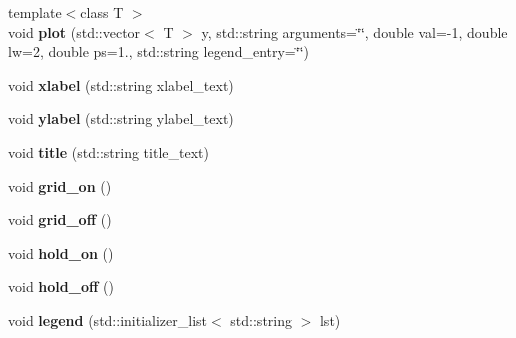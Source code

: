 \begin{DoxyCompactItemize}
\item 
\hypertarget{classkeycpp_1_1_figure_a3646790552f73645bf926b1678fede40}{{\footnotesize template$<$class T $>$ }\\void {\bfseries plot} (std\-::vector$<$ T $>$ y, std\-::string arguments=\char`\"{}\char`\"{}, double val=-\/1, double lw=2, double ps=1., std\-::string legend\-\_\-entry=\char`\"{}\char`\"{})}\label{classkeycpp_1_1_figure_a3646790552f73645bf926b1678fede40}

\item 
\hypertarget{classkeycpp_1_1_figure_addd610a718f021f3e6c7c94f9bc7f285}{void {\bfseries xlabel} (std\-::string xlabel\-\_\-text)}\label{classkeycpp_1_1_figure_addd610a718f021f3e6c7c94f9bc7f285}

\item 
\hypertarget{classkeycpp_1_1_figure_aa965967db2165b001860f75fc22c9f28}{void {\bfseries ylabel} (std\-::string ylabel\-\_\-text)}\label{classkeycpp_1_1_figure_aa965967db2165b001860f75fc22c9f28}

\item 
\hypertarget{classkeycpp_1_1_figure_a922bd966ed40095f0ae7fa184f9d0ada}{void {\bfseries title} (std\-::string title\-\_\-text)}\label{classkeycpp_1_1_figure_a922bd966ed40095f0ae7fa184f9d0ada}

\item 
\hypertarget{classkeycpp_1_1_figure_a3c036559f8ad56b099ac0b44c652225d}{void {\bfseries grid\-\_\-on} ()}\label{classkeycpp_1_1_figure_a3c036559f8ad56b099ac0b44c652225d}

\item 
\hypertarget{classkeycpp_1_1_figure_a3736e01bc278c2c2b47e4ff046fdda0e}{void {\bfseries grid\-\_\-off} ()}\label{classkeycpp_1_1_figure_a3736e01bc278c2c2b47e4ff046fdda0e}

\item 
\hypertarget{classkeycpp_1_1_figure_a65b80e5b67c7bbf225e3001a538a6dad}{void {\bfseries hold\-\_\-on} ()}\label{classkeycpp_1_1_figure_a65b80e5b67c7bbf225e3001a538a6dad}

\item 
\hypertarget{classkeycpp_1_1_figure_ae5e5ac67e9450ea4fbf06fb3fcc6523a}{void {\bfseries hold\-\_\-off} ()}\label{classkeycpp_1_1_figure_ae5e5ac67e9450ea4fbf06fb3fcc6523a}

\item 
\hypertarget{classkeycpp_1_1_figure_a315140182f731518bc1f6f037a12c3a5}{void {\bfseries legend} (std\-::initializer\-\_\-list$<$ std\-::string $>$ lst)}\label{classkeycpp_1_1_figure_a315140182f731518bc1f6f037a12c3a5}


\end{DoxyCompactItemize}
